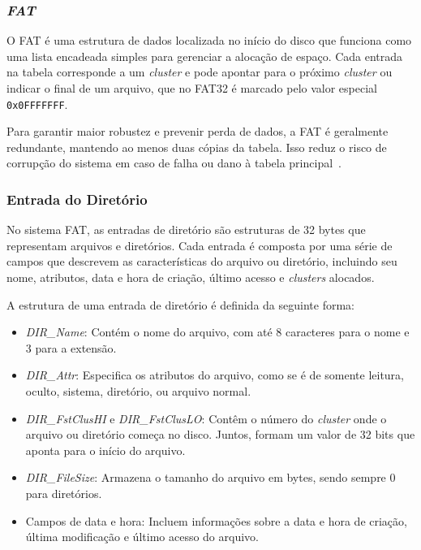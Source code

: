 \documentclass[
    12pt,				%
    oneside,   	        %
    a4paper,			%
    english,			%
    french,				%
    spanish,			%
    brazil,				%
    ]{pacotes/abntex2}
\begin{document}
\subsubsection{\textit{FAT}}
\label{subsubsec:fsinfo}

O FAT é uma estrutura de dados localizada no início do disco que funciona como uma lista encadeada simples para gerenciar a alocação de espaço. Cada entrada na tabela corresponde a um \textit{cluster} e pode apontar para o próximo \textit{cluster} ou indicar o final de um arquivo, que no FAT32 é marcado pelo valor especial \texttt{0x0FFFFFFF}.

Para garantir maior robustez e prevenir perda de dados, a FAT é geralmente redundante, mantendo ao menos duas cópias da tabela. Isso reduz o risco de corrupção do sistema em caso de falha ou dano à tabela principal~\cite{microsoft2000}.

\subsubsection{Entrada do Diretório}
\label{subsubsec:dentry}

No sistema FAT, as entradas de diretório são estruturas de 32 bytes que representam arquivos e diretórios. Cada entrada é composta por uma série de campos que descrevem as características do arquivo ou diretório, incluindo seu nome, atributos, data e hora de criação, último acesso e \textit{clusters} alocados.

A estrutura de uma entrada de diretório é definida da seguinte forma:

\begin{itemize} 
    \item \textit{DIR\_Name}: Contém o nome do arquivo, com até 8 caracteres para o nome e 3 para a extensão. 
    \item \textit{DIR\_Attr}: Especifica os atributos do arquivo, como se é de somente leitura, oculto, sistema, diretório, ou arquivo normal.
    \item \textit{DIR\_FstClusHI} e \textit{DIR\_FstClusLO}: Contêm o número do \textit{cluster} onde o arquivo ou diretório começa no disco. Juntos, formam um valor de 32 bits que aponta para o início do arquivo. 
    \item \textit{DIR\_FileSize}: Armazena o tamanho do arquivo em bytes, sendo sempre 0 para diretórios. 
    \item Campos de data e hora: Incluem informações sobre a data e hora de criação, última modificação e último acesso do arquivo. 
\end{itemize}
\end{document}
